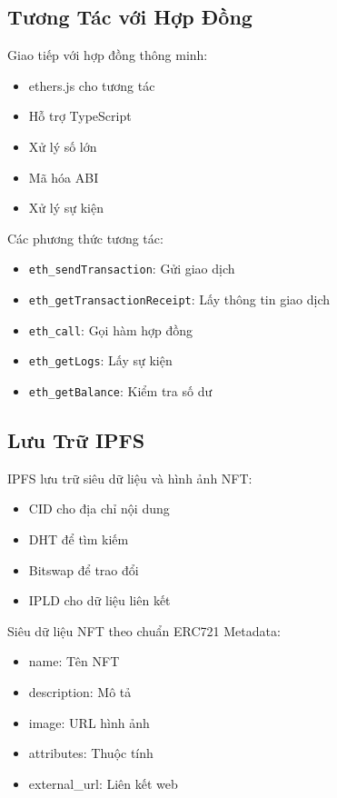 \subsection{Tương Tác với Hợp Đồng}
Giao tiếp với hợp đồng thông minh:
\begin{itemize}
    \item ethers.js cho tương tác
    \item Hỗ trợ TypeScript
    \item Xử lý số lớn
    \item Mã hóa ABI
    \item Xử lý sự kiện
\end{itemize}
Các phương thức tương tác:
\begin{itemize}
    \item \texttt{eth\_sendTransaction}: Gửi giao dịch
    \item \texttt{eth\_getTransactionReceipt}: Lấy thông tin giao dịch
    \item \texttt{eth\_call}: Gọi hàm hợp đồng
    \item \texttt{eth\_getLogs}: Lấy sự kiện
    \item \texttt{eth\_getBalance}: Kiểm tra số dư
\end{itemize}

\subsection{Lưu Trữ IPFS}
IPFS lưu trữ siêu dữ liệu và hình ảnh NFT:
\begin{itemize}
    \item CID cho địa chỉ nội dung
    \item DHT để tìm kiếm
    \item Bitswap để trao đổi
    \item IPLD cho dữ liệu liên kết
\end{itemize}
Siêu dữ liệu NFT theo chuẩn ERC721 Metadata:
\begin{itemize}
    \item name: Tên NFT
    \item description: Mô tả
    \item image: URL hình ảnh
    \item attributes: Thuộc tính
    \item external\_url: Liên kết web
\end{itemize} 